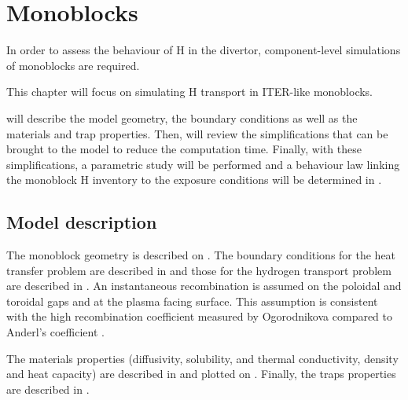 \setchapterpreamble[u]{\margintoc}
\chapter{Monoblocks}\label{Chapter3}

In order to assess the behaviour of H in the divertor, component-level simulations of monoblocks are required.

This chapter will focus on simulating H transport in ITER-like monoblocks.

 will describe the model geometry, the boundary conditions as well as the materials and trap properties.
Then,  will review the simplifications that can be brought to the model to reduce the computation time.
Finally, with these simplifications, a parametric study will be performed and a behaviour law linking the monoblock H inventory to the exposure conditions will be determined in .

\section{Model description}

The monoblock geometry is described on .
The boundary conditions for the heat transfer problem are described in  and those for the hydrogen transport problem are described in .
An instantaneous recombination is assumed on the poloidal and toroidal gaps and at the plasma facing surface.
This assumption is consistent with the high recombination coefficient measured by Ogorodnikova  compared to Anderl's coefficient .

The materials properties (diffusivity, solubility, and thermal conductivity, density and heat capacity) are described in  and plotted on .
Finally, the traps properties are described in .

